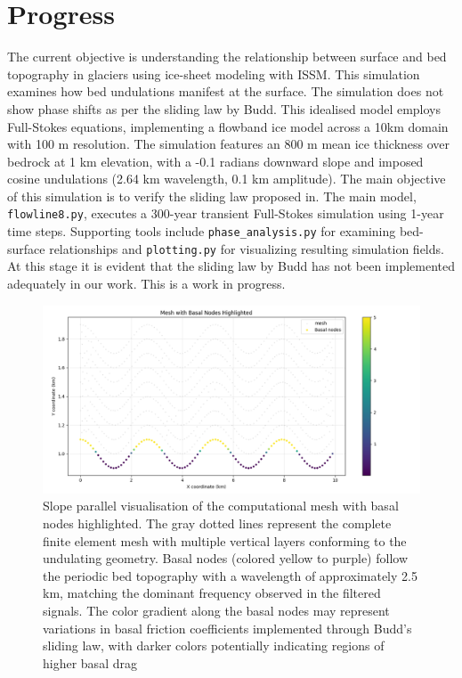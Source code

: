 \chapter{Progress}

The current objective is understanding the relationship between surface and bed topography in glaciers using ice-sheet modeling with ISSM. This simulation examines how bed undulations manifest at the surface. The simulation does not show phase shifts as per the sliding law by Budd. This idealised model employs Full-Stokes equations, implementing a flowband ice model across a 10km domain with 100 m resolution. The simulation features an 800 m mean ice thickness over bedrock at 1 km elevation, with a -0.1 radians downward slope and imposed cosine undulations (2.64 km wavelength, 0.1 km amplitude). The main objective of this simulation is to verify the sliding law proposed in\cite{Budd_1970}. The main model, \texttt{flowline8.py}, executes a 300-year transient Full-Stokes simulation using 1-year time steps. Supporting tools include \texttt{phase\_analysis.py} for examining bed-surface relationships and \texttt{plotting.py} for visualizing resulting simulation fields. At this stage it is evident that the sliding law by Budd has not been implemented adequately in our work. This is a work in progress.

\begin{figure}[H]
    \includegraphics[scale=0.5]{basal_friction.png}
    \caption{Slope parallel visualisation of the computational mesh with basal nodes highlighted. The gray dotted lines represent the complete finite element mesh with multiple vertical layers conforming to the undulating geometry. Basal nodes (colored yellow to purple) follow the periodic bed topography with a wavelength of approximately 2.5 km, matching the dominant frequency observed in the filtered signals. The color gradient along the basal nodes may represent variations in basal friction coefficients implemented through Budd's sliding law, with darker colors potentially indicating regions of higher basal drag}
    \label{fig:Friction}
\end{figure}

